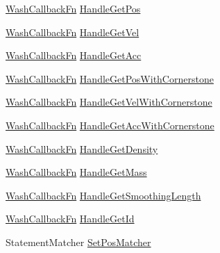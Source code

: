 \begin{DoxyCompactItemize}
\item 
\mbox{\hyperlink{namespacews2st_a682dfda40d8282c7e579a7b826a7d861}{Wash\+Callback\+Fn}} \mbox{\hyperlink{namespacews2st_1_1refactor_1_1forces_aec5227182499f251808fad379e171dc9}{Handle\+Get\+Pos}}
\item 
\mbox{\hyperlink{namespacews2st_a682dfda40d8282c7e579a7b826a7d861}{Wash\+Callback\+Fn}} \mbox{\hyperlink{namespacews2st_1_1refactor_1_1forces_a70b145611ab770c410f13a2d5e2ed274}{Handle\+Get\+Vel}}
\item 
\mbox{\hyperlink{namespacews2st_a682dfda40d8282c7e579a7b826a7d861}{Wash\+Callback\+Fn}} \mbox{\hyperlink{namespacews2st_1_1refactor_1_1forces_aa273eb05dee50c3e1666727007ab6d0c}{Handle\+Get\+Acc}}
\item 
\mbox{\hyperlink{namespacews2st_a682dfda40d8282c7e579a7b826a7d861}{Wash\+Callback\+Fn}} \mbox{\hyperlink{namespacews2st_1_1refactor_1_1forces_a1d3d1487f9d3f37f0a4e865c5e345911}{Handle\+Get\+Pos\+With\+Cornerstone}}
\item 
\mbox{\hyperlink{namespacews2st_a682dfda40d8282c7e579a7b826a7d861}{Wash\+Callback\+Fn}} \mbox{\hyperlink{namespacews2st_1_1refactor_1_1forces_a09be37fd0486dbc72f2aa46329e9cd0f}{Handle\+Get\+Vel\+With\+Cornerstone}}
\item 
\mbox{\hyperlink{namespacews2st_a682dfda40d8282c7e579a7b826a7d861}{Wash\+Callback\+Fn}} \mbox{\hyperlink{namespacews2st_1_1refactor_1_1forces_a2b2d25e98ff8a890d84c0e2b397a5756}{Handle\+Get\+Acc\+With\+Cornerstone}}
\item 
\mbox{\hyperlink{namespacews2st_a682dfda40d8282c7e579a7b826a7d861}{Wash\+Callback\+Fn}} \mbox{\hyperlink{namespacews2st_1_1refactor_1_1forces_a1f84572017145f028dbd010d0c0f95ed}{Handle\+Get\+Density}}
\item 
\mbox{\hyperlink{namespacews2st_a682dfda40d8282c7e579a7b826a7d861}{Wash\+Callback\+Fn}} \mbox{\hyperlink{namespacews2st_1_1refactor_1_1forces_a2f791e3898c17e8b4e3034663949a656}{Handle\+Get\+Mass}}
\item 
\mbox{\hyperlink{namespacews2st_a682dfda40d8282c7e579a7b826a7d861}{Wash\+Callback\+Fn}} \mbox{\hyperlink{namespacews2st_1_1refactor_1_1forces_a6971fd7441dad1a1d4dd1ba8fd7b29f5}{Handle\+Get\+Smoothing\+Length}}
\item 
\mbox{\hyperlink{namespacews2st_a682dfda40d8282c7e579a7b826a7d861}{Wash\+Callback\+Fn}} \mbox{\hyperlink{namespacews2st_1_1refactor_1_1forces_ad782ea3f7d021d27bc5e65b8170c445b}{Handle\+Get\+Id}}
\item 
Statement\+Matcher \mbox{\hyperlink{namespacews2st_1_1refactor_1_1forces_a505fd1d7688a82383f89f9fc829a1c22}{Set\+Pos\+Matcher}}

\end{DoxyCompactItemize}
